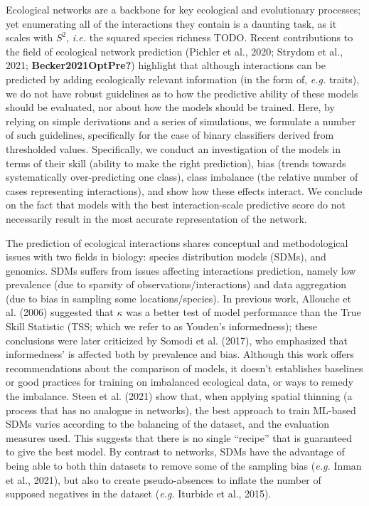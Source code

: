 \documentclass[11pt]{article}
\begin{document}
\vfill

\clearpage
\linenumbers
\pagestyle{normal}

Ecological networks are a backbone for key ecological and evolutionary
processes; yet enumerating all of the interactions they contain is a
daunting task, as it scales with \(S^2\), \emph{i.e.} the squared
species richness TODO. Recent contributions to the field of ecological
network prediction (Pichler et al., 2020; Strydom et al., 2021;
\textbf{Becker2021OptPre?}) highlight that although interactions can be
predicted by adding ecologically relevant information (in the form of,
\emph{e.g.} traits), we do not have robust guidelines as to how the
predictive ability of these models should be evaluated, nor about how
the models should be trained. Here, by relying on simple derivations and
a series of simulations, we formulate a number of such guidelines,
specifically for the case of binary classifiers derived from thresholded
values. Specifically, we conduct an investigation of the models in terms
of their skill (ability to make the right prediction), bias (trends
towards systematically over-predicting one class), class imbalance (the
relative number of cases representing interactions), and show how these
effects interact. We conclude on the fact that models with the best
interaction-scale predictive score do not necessarily result in the most
accurate representation of the network.

The prediction of ecological interactions shares conceptual and
methodological issues with two fields in biology: species distribution
models (SDMs), and genomics. SDMs suffers from issues affecting
interactions prediction, namely low prevalence (due to sparsity of
observations/interactions) and data aggregation (due to bias in sampling
some locations/species). In previous work, Allouche et al. (2006)
suggested that \(\kappa\) was a better test of model performance than
the True Skill Statistic (TSS; which we refer to as Youden's
informedness); these conclusions were later criticized by Somodi et al.
(2017), who emphasized that informedness' is affected both by prevalence
and bias. Although this work offers recommendations about the comparison
of models, it doesn't establishes baselines or good practices for
training on imbalanced ecological data, or ways to remedy the imbalance.
Steen et al. (2021) show that, when applying spatial thinning (a process
that has no analogue in networks), the best approach to train ML-based
SDMs varies according to the balancing of the dataset, and the
evaluation measures used. This suggests that there is no single
``recipe'' that is guaranteed to give the best model. By contrast to
networks, SDMs have the advantage of being able to both thin datasets to
remove some of the sampling bias (\emph{e.g.} Inman et al., 2021), but
also to create pseudo-absences to inflate the number of supposed
negatives in the dataset (\emph{e.g.} Iturbide et al., 2015).
\end{document}
